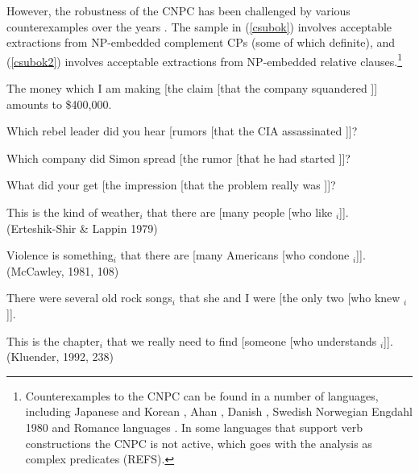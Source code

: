 \documentclass[output=paper]{langsci/langscibook}
\begin{document}
However, the robustness of the CNPC  has been challenged by various
counterexamples over the years \citep{Ross67,pollardsag,kluender,postal98,saghof}.
The sample in (\ref{csubok}) involves acceptable
extractions from NP-embedded complement CPs (some of which definite),
 and (\ref{csubok2}) involves acceptable extractions from NP-embedded relative clauses.\footnote{Counterexamples to  the CNPC can be found in a number of languages, 
including Japanese and  Korean \citep{kunojap,Nishigauchi99},  Ahan \citep{saah},  Danish  \citep[ch.2]{shir}, Swedish  \citep{allwood,engdahl82} Norwegian  Engdahl 1980 \citep{taraldsen82} and Romance languages \citep{Cinque10}.  In some languages that support verb constructions the CNPC is 
 not active, which goes with the analysis as complex predicates (REFS).}


\ea \label{csubok}
\ea The money which I am making [the claim [that the company squandered \spc]] amounts to \$400,000.\\
 \citep[206, 207]{pollardsag}

\item  Which rebel leader did you hear [rumors [that the CIA assassinated \spc]]?
\item Which company did Simon spread [the rumor [that he had started \spc]]?
\item What did your get [the impression [that the problem really was \spc]]?\\
\citep{kluender}
\z
\z


\ea \label{csubok2}
\ea This is the kind of weather$_i$ that there are [many people [who like \spc$_i$]].\\
(Erteshik-Shir \& Lappin 1979)

\item Violence is something$_i$ that there are [many Americans [who condone \spc$_i$]].\\
(McCawley, 1981, 108)

\item There were several old rock songs$_i$ that she and I were [the only two [who
knew \spc$_i$]].\\
\citep{chungmc}

\item This is the chapter$_i$ that we really need to find [someone [who understands \spc$_i$]].\\
(Kluender, 1992, 238)
\end{document}
